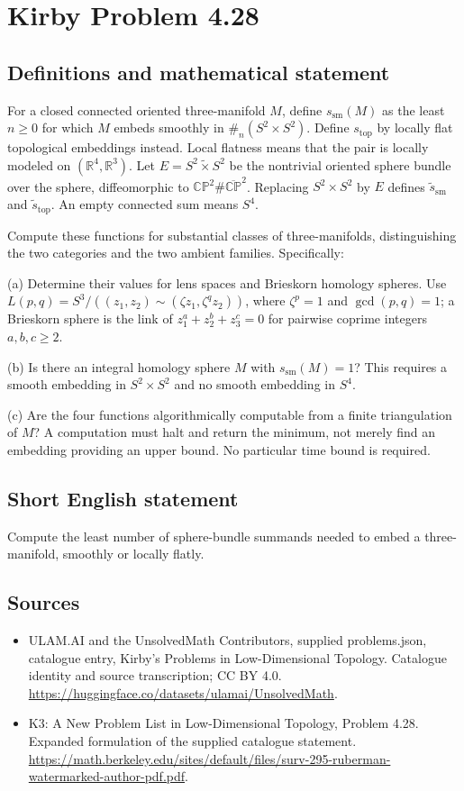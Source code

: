 \documentclass[11pt,a4paper]{article}
\begin{document}
\section*{Kirby Problem 4.28}\label{statement}

\subsection{Definitions and mathematical statement}
For a closed connected oriented three-manifold $M$, define $s_{\mathrm{sm}}(M)$ as the least $n\ge0$ for which $M$ embeds smoothly in $\#_n(S^2\times S^2)$. Define $s_{\mathrm{top}}$ by locally flat topological embeddings instead. Local flatness means that the pair is locally modeled on $(\mathbb R^4,\mathbb R^3)$. Let $E=S^2\widetilde\times S^2$ be the nontrivial oriented sphere bundle over the sphere, diffeomorphic to $\mathbb{CP}^2\#\overline{\mathbb{CP}}^{2}$. Replacing $S^2\times S^2$ by $E$ defines $\widetilde s_{\mathrm{sm}}$ and $\widetilde s_{\mathrm{top}}$. An empty connected sum means $S^4$.

Compute these functions for substantial classes of three-manifolds, distinguishing the two categories and the two ambient families. Specifically:

(a) Determine their values for lens spaces and Brieskorn homology spheres. Use $L(p,q)=S^3/((z_1,z_2)\sim(\zeta z_1,\zeta^qz_2))$, where $\zeta^p=1$ and $\gcd(p,q)=1$; a Brieskorn sphere is the link of $z_1^a+z_2^b+z_3^c=0$ for pairwise coprime integers $a,b,c\ge2$.

(b) Is there an integral homology sphere $M$ with $s_{\mathrm{sm}}(M)=1$? This requires a smooth embedding in $S^2\times S^2$ and no smooth embedding in $S^4$.

(c) Are the four functions algorithmically computable from a finite triangulation of $M$? A computation must halt and return the minimum, not merely find an embedding providing an upper bound. No particular time bound is required.
\subsection{Short English statement}
Compute the least number of sphere-bundle summands needed to embed a three-manifold, smoothly or locally flatly.
\subsection{Sources}
\begin{itemize}
\item[S1] ULAM.AI and the UnsolvedMath Contributors, supplied problems.json, catalogue entry, Kirby's Problems in Low-Dimensional Topology. Catalogue identity and source transcription; CC BY 4.0.
\url{https://huggingface.co/datasets/ulamai/UnsolvedMath}.
\item[S2] K3: A New Problem List in Low-Dimensional Topology, Problem 4.28. Expanded formulation of the supplied catalogue statement.
\url{https://math.berkeley.edu/sites/default/files/surv-295-ruberman-watermarked-author-pdf.pdf}.
\end{itemize}
\end{document}
